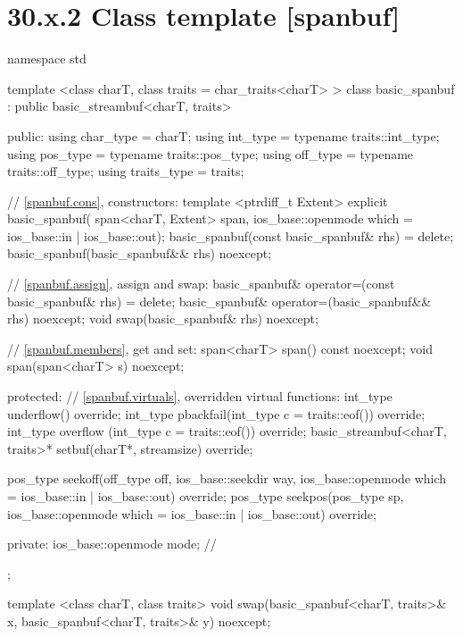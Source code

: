 \documentclass[ebook,11pt,article]{memoir}
\begin{document}
\section{30.x.2 Class template  [spanbuf]}
\begin{codeblock}
namespace std {
  template <class charT, class traits = char_traits<charT> >
  class basic_spanbuf
    : public basic_streambuf<charT, traits> {
  public:
    using char_type      = charT;
    using int_type       = typename traits::int_type;
    using pos_type       = typename traits::pos_type;
    using off_type       = typename traits::off_type;
    using traits_type    = traits;

    // \ref{spanbuf.cons}, constructors:
    template <ptrdiff_t Extent>
    explicit basic_spanbuf(
      span<charT, Extent> span,
      ios_base::openmode which = ios_base::in | ios_base::out);
    basic_spanbuf(const basic_spanbuf& rhs) = delete;
    basic_spanbuf(basic_spanbuf&& rhs) noexcept;

    // \ref{spanbuf.assign}, assign and swap:
    basic_spanbuf& operator=(const basic_spanbuf& rhs) = delete;
    basic_spanbuf& operator=(basic_spanbuf&& rhs) noexcept;
    void swap(basic_spanbuf& rhs) noexcept;

    // \ref{spanbuf.members}, get and set:
    span<charT> span() const noexcept;
    void span(span<charT> s) noexcept;

  protected:
    // \ref{spanbuf.virtuals}, overridden virtual functions:
    int_type underflow() override;
    int_type pbackfail(int_type c = traits::eof()) override;
    int_type overflow (int_type c = traits::eof()) override;
    basic_streambuf<charT, traits>* setbuf(charT*, streamsize) override;

    pos_type seekoff(off_type off, ios_base::seekdir way,
                     ios_base::openmode which
                      = ios_base::in | ios_base::out) override;
    pos_type seekpos(pos_type sp,
                     ios_base::openmode which
                      = ios_base::in | ios_base::out) override;

  private:
    ios_base::openmode mode;  // \expos
  };

  template <class charT, class traits>
    void swap(basic_spanbuf<charT, traits>& x,
              basic_spanbuf<charT, traits>& y) noexcept;
}
\end{codeblock}
\end{document}
